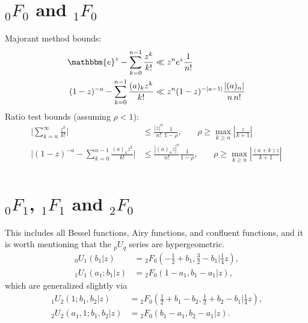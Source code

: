 \documentclass[12pt]{article}
\newcommand{\ee}[0] {\mathbbm{e}}
\numberwithin{equation}{section}
\newcommand{\FFf}[5] {{}_{#1}{#2}_{#3} \left(#4 | {#5} \right)}
\begin{document}
\section{${}_0 F_0$ and ${}_1 F_0$}
Majorant method bounds:
\begin{equation}
\label{equ_f0_maj}
\begin{alignedat}{3}
\ee^z - \sum_{k=0}^{n-1} \frac{z^k}{k!} &\ll z^n e^z \frac{1}{n!}\\
(1-z)^{-a} - \sum_{k=0}^{n-1} \frac{(a)_k z^k}{k!} &\ll z^n (1-z)^{-|a-1|} \frac{|(a)_n|}{n \, n!}\\
\end{alignedat}
\end{equation}
Ratio test bounds (assuming $\rho < 1$):
\begin{equation}
\begin{alignedat}{3}
\Big| \sum_{k=n}^{\infty} \frac{z^k}{k!} \Big| &\le \frac{|z|^n}{n!} \frac{1}{1-\rho}\text{,} \quad \quad \rho \ge \max_{k \ge n} | \tfrac{z}{k+1} | \\
\Big| (1-z)^{-a} - \sum_{k=0}^{n-1} \frac{(a)_k z^k}{k!} \Big| &\le \frac{|(a)_n z|^n}{n!} \frac{1}{1-\rho}\text{,} \quad \quad \rho \ge \max_{k \ge n} | \tfrac{(a+k)z}{k+1} | \\
\end{alignedat}
\end{equation}


\section{${}_0 F_1$, ${}_1 F_1$ and ${}_2 F_0$} This includes all Bessel functions, Airy functions, and confluent functions, and it is worth mentioning that the ${}_p U_{q}$ series are hypergeometric.
\begin{align*}
\FFf{0}{U}{1}{b_1}{z} &= \FFf{2}{F}{0}{-\tfrac{1}{2}+b_1, \tfrac{3}{2}-b_1}{\tfrac{1}{4}z}\text{,}\\
\FFf{1}{U}{1}{a_1;b_1}{z} &= \FFf{2}{F}{0}{1-a_1, b_1-a_1}{z}\text{,}
\end{align*}
which are generalized slightly via
\begin{equation}
\label{equ_pUq_as_hyp}
\begin{alignedat}{5}
\FFf{1}{U}{2}{1;b_1,b_2}{z} &= \FFf{2}{F}{0}{\tfrac{1}{2}+b_1-b_2, \tfrac{1}{2}+b_2-b_1}{\tfrac{1}{4}z}\text{,}\\
\FFf{2}{U}{2}{a_1,1;b_1,b_2}{z} &= \FFf{2}{F}{0}{b_1-a_1, b_2-a_1}{z}\text{.}
\end{alignedat}
\end{equation}
\end{document}
